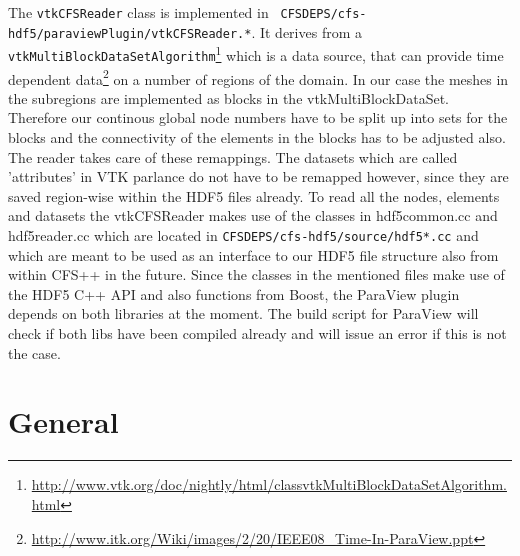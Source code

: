 The     {\tt     vtkCFSReader}     class     is    implemented     in     {\tt
CFSDEPS/cfs-hdf5/paraviewPlugin/vtkCFSReader.*}.   It   derives  from  a  {\tt
vtkMultiBlockDataSetAlgorithm}\footnote{\url{http://www.vtk.org/doc/nightly/html/classvtkMultiBlockDataSetAlgorithm.html}}
which    is   a    data   source,    that   can    provide    time   dependent
data\footnote{\url{http://www.itk.org/Wiki/images/2/20/IEEE08_Time-In-ParaView.ppt}}
\cite{Biddiscombe2007} on a number of regions  of the domain.  In our case the
meshes   in    the   subregions   are    implemented   as   blocks    in   the
vtkMultiBlockDataSet. Therefore  our continous global node numbers  have to be
split up into sets for the blocks  and the connectivity of the elements in the
blocks has to be adjusted also. The reader takes care of these remappings. The
datasets  which are  called 'attributes'  in VTK  parlance do  not have  to be
remapped  however, since  they are  saved  region-wise within  the HDF5  files
already. To read  all the nodes, elements and  datasets the vtkCFSReader makes
use of  the classes  in hdf5common.cc and  hdf5reader.cc which are  located in
{\tt CFSDEPS/cfs-hdf5/source/hdf5*.cc}  and which are  meant to be used  as an
interface  to  our  HDF5  file   structure  also  from  within  CFS++  in  the
future. Since the classes in the mentioned  files make use of the HDF5 C++ API
and also functions  from Boost, the ParaView plugin  depends on both libraries
at the  moment.  The build  script for ParaView  will check if both  libs have
been compiled already and will issue an error if this is not the case.


















\section{General}
